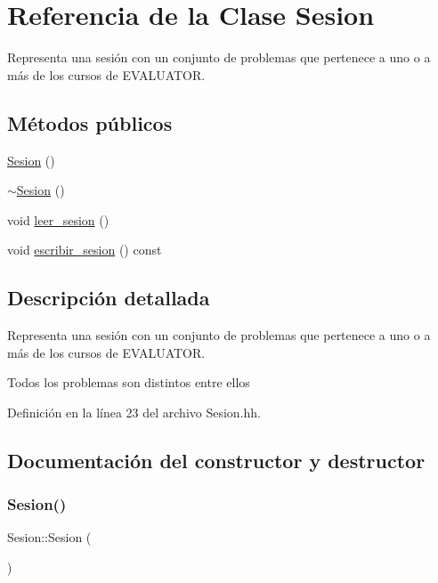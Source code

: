 \hypertarget{class_sesion}{}\section{Referencia de la Clase Sesion}
\label{class_sesion}


Representa una sesión con un conjunto de problemas que pertenece a uno o a más de los cursos de E\+V\+A\+L\+U\+A\+T\+OR.  


\subsection*{Métodos públicos}
\begin{DoxyCompactItemize}
\item 
\mbox{\hyperlink{class_sesion_adf5a84efa8e2629b30ad89df74cfc0a2}{Sesion}} ()
\item 
\mbox{\hyperlink{class_sesion_acc4bd3e753a45d6b7a01aa27fb8f171f}{$\sim$\+Sesion}} ()
\item 
void \mbox{\hyperlink{class_sesion_a970d42fc3310a465b78b5a1549c30ec1}{leer\+\_\+sesion}} ()
\item 
void \mbox{\hyperlink{class_sesion_a0472395ecd329355cccd46b3d3e8a8a0}{escribir\+\_\+sesion}} () const
\end{DoxyCompactItemize}


\subsection{Descripción detallada}
Representa una sesión con un conjunto de problemas que pertenece a uno o a más de los cursos de E\+V\+A\+L\+U\+A\+T\+OR. 

Todos los problemas son distintos entre ellos 

Definición en la línea 23 del archivo Sesion.\+hh.



\subsection{Documentación del constructor y destructor}
\mbox{\label{class_sesion_adf5a84efa8e2629b30ad89df74cfc0a2}} 
\subsubsection{\texorpdfstring{Sesion()}{Sesion()}}
{\footnotesize\ttfamily Sesion\+::\+Sesion (\begin{DoxyParamCaption}{ }\end{DoxyParamCaption})}


